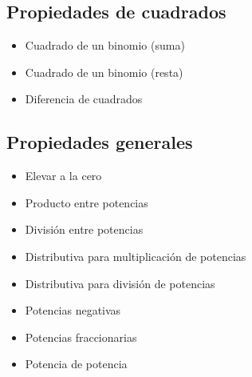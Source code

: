 \subsection*{Propiedades de cuadrados}
\begin{itemize}
\item
{}
Cuadrado de un binomio (suma)

\item
{} 
Cuadrado de un binomio (resta)

\item
{} Diferencia de cuadrados
\end{itemize}


\subsection*{Propiedades generales}

\begin{itemize}
\item
{}
Elevar a la cero

\item
{}
Producto entre potencias

\item
{}
División entre potencias

\item
{}
Distributiva para multiplicación de potencias

\item
{}
Distributiva para división de potencias

\item
{}
Potencias negativas

\item
{}
Potencias fraccionarias

\item
{}
Potencia de potencia
\end{itemize}